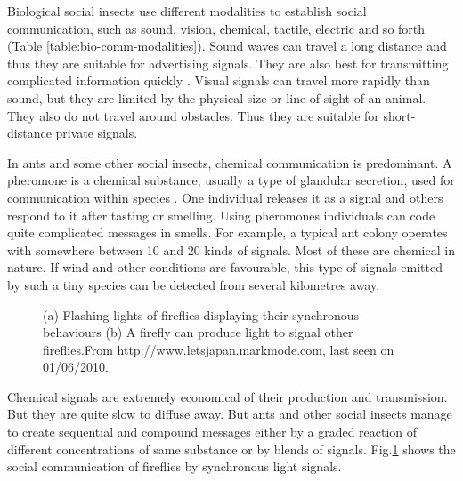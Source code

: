 Biological social insects use different modalities to establish social communication, such as sound, vision, chemical, tactile,  electric and so forth (Table \ref{table:bio-comm-modalities}).  Sound waves can travel a long distance and thus they are suitable for advertising signals. They are also best for transmitting complicated information quickly \cite{Slater1986}. Visual signals can travel more rapidly than sound, but they are limited by the physical size or line of sight of an animal. They also do not travel around obstacles. Thus they are suitable for short-distance private signals.

In ants and some other social insects, chemical communication is predominant.  A pheromone is a chemical substance, usually a type of glandular secretion, used for communication within species \cite{Holldobler1990}. One individual releases it as a signal and others respond to it after tasting or smelling. Using pheromones individuals can code quite complicated messages in smells. For example, a typical ant colony operates with somewhere between 10 and 20 kinds of signals. Most of these are chemical in nature. If wind and other conditions are favourable,  this type of signals emitted by such a tiny species can be detected from several kilometres away. 
\begin{figure}[htp]
\centering
{} 
\hspace{0.25cm}
\caption{(a) Flashing lights of fireflies displaying their synchronous behaviours (b) A firefly can produce light to signal other fireflies.\protect\newline From http://www.letsjapan.markmode.com, last seen on 01/06/2010.}
\label{fig:fireflies}
\end{figure}

Chemical signals are extremely economical of their production and transmission. But they are quite slow to diffuse away. But ants and other social insects manage to create sequential and compound messages either by a graded reaction of different concentrations of same substance or by blends of signals. Fig.\ref{fig:fireflies} shows the social communication of fireflies by  synchronous light signals.

